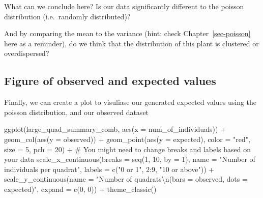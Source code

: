 \documentclass[
  letterpaper,
  DIV=11,
  numbers=noendperiod]{scrreprt}
\newenvironment{Shaded}{\begin{snugshade}}{\end{snugshade}}
\newcommand{\AttributeTok}[1]{\textcolor[rgb]{0.40,0.45,0.13}{#1}}
\newcommand{\CommentTok}[1]{\textcolor[rgb]{0.37,0.37,0.37}{#1}}
\newcommand{\DecValTok}[1]{\textcolor[rgb]{0.68,0.00,0.00}{#1}}
\newcommand{\FunctionTok}[1]{\textcolor[rgb]{0.28,0.35,0.67}{#1}}
\newcommand{\NormalTok}[1]{\textcolor[rgb]{0.00,0.23,0.31}{#1}}
\newcommand{\SpecialCharTok}[1]{\textcolor[rgb]{0.37,0.37,0.37}{#1}}
\newcommand{\StringTok}[1]{\textcolor[rgb]{0.13,0.47,0.30}{#1}}
\begin{document}
What can we conclude here? Is our data significantly different to the
poisson distribution (i.e.~randomly distributed)?

And by comparing the mean to the variance (hint: check
Chapter~\ref{sec-poisson} here as a reminder), do we think that the
distribution of this plant is clustered or overdispersed?

\subsection{Figure of observed and expected
values}\label{figure-of-observed-and-expected-values}

Finally, we can create a plot to visuliase our generated expected values
using the poisson distribution, and our observed dataset

\begin{Shaded}
\begin{Highlighting}[]
\FunctionTok{ggplot}\NormalTok{(large\_quad\_summary\_comb, }\FunctionTok{aes}\NormalTok{(}\AttributeTok{x =}\NormalTok{ num\_of\_individuals)) }\SpecialCharTok{+}
  \FunctionTok{geom\_col}\NormalTok{(}\FunctionTok{aes}\NormalTok{(}\AttributeTok{y =}\NormalTok{ observed)) }\SpecialCharTok{+}
  \FunctionTok{geom\_point}\NormalTok{(}\FunctionTok{aes}\NormalTok{(}\AttributeTok{y =}\NormalTok{ expected), }
             \AttributeTok{color =} \StringTok{"red"}\NormalTok{, }\AttributeTok{size =} \DecValTok{5}\NormalTok{, }\AttributeTok{pch =} \DecValTok{20}\NormalTok{) }\SpecialCharTok{+}
  \CommentTok{\# You might need to change breaks and labels based on your data}
  \FunctionTok{scale\_x\_continuous}\NormalTok{(}\AttributeTok{breaks =} \FunctionTok{seq}\NormalTok{(}\DecValTok{1}\NormalTok{, }\DecValTok{10}\NormalTok{, }\AttributeTok{by =} \DecValTok{1}\NormalTok{),}
                     \AttributeTok{name =} \StringTok{"Number of individuals per quadrat"}\NormalTok{,}
                     \AttributeTok{labels =} \FunctionTok{c}\NormalTok{(}\StringTok{"0 or 1"}\NormalTok{, }\DecValTok{2}\SpecialCharTok{:}\DecValTok{9}\NormalTok{, }\StringTok{"10 or above"}\NormalTok{)) }\SpecialCharTok{+}
  \FunctionTok{scale\_y\_continuous}\NormalTok{(}\AttributeTok{name =} \StringTok{"Number of quadrats}\SpecialCharTok{\textbackslash{}n}\StringTok{(bars = observed, dots = expected)"}\NormalTok{,}
                     \AttributeTok{expand =} \FunctionTok{c}\NormalTok{(}\DecValTok{0}\NormalTok{, }\DecValTok{0}\NormalTok{)) }\SpecialCharTok{+}
  \FunctionTok{theme\_classic}\NormalTok{() }
\end{Highlighting}
\end{Shaded}
\end{document}
